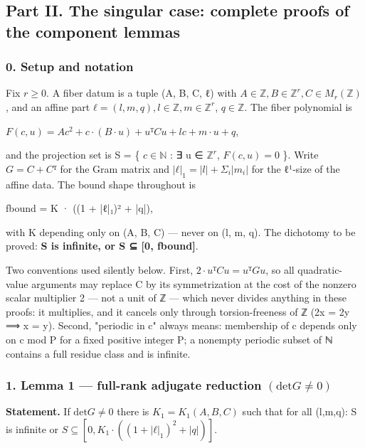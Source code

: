 \subsection*{Part II. The singular case: complete proofs of the component lemmas}
\subsubsection*{0. Setup and notation}
Fix $r ≥ 0$. A fiber datum is a tuple (A, B, C, ℓ) with $A ∈ ℤ, B ∈ ℤ^{r}, C ∈ M_{r}(ℤ)$, and an affine part $ℓ = (l, m, q), l ∈ ℤ, m ∈ ℤ^{r}$, $q ∈ ℤ$. The fiber polynomial is

$F(c, u) = A c^{2} + c·(B·u) + uᵀCu + l c + m·u + q$,

and the projection set is S = \{ $c ∈ ℕ$ : ∃ u ∈ $ℤ^{r}$, $F(c,u) = 0$ \}. Write $G = C + Cᵀ$ for the Gram matrix and $|ℓ|_{1} = |l| + Σ_{i}|m_{i}|$ for the ℓ¹-size of the affine data. The bound shape throughout is

fbound = K · ((1 + |ℓ|₁)² + |q|),

with K depending only on (A, B, C) — never on (l, m, q). The dichotomy to be proved: \textbf{S is infinite, or S ⊆ [0, fbound]}.

Two conventions used silently below. First, $2·uᵀCu = uᵀGu$, so all quadratic-value arguments may replace C by its symmetrization at the cost of the nonzero scalar multiplier 2 — not a unit of ℤ — which never divides anything in these proofs: it multiplies, and it cancels only through torsion-freeness of ℤ (2x = 2y ⟹ x = y). Second, "periodic in c" always means: membership of c depends only on c mod P for a fixed positive integer P; a nonempty periodic subset of ℕ contains a full residue class and is infinite.

\subsubsection*{1. Lemma 1 — full-rank adjugate reduction $(\mathrm{det} G ≠ 0)$}
\textbf{Statement.} If $\mathrm{det} G ≠ 0$ there is $K_{1} = K_{1}(A,B,C)$ such that for all (l,m,q): S is infinite or $S ⊆ [0, K_{1}·((1+|ℓ|_{1})^{2}+|q|)]$.

